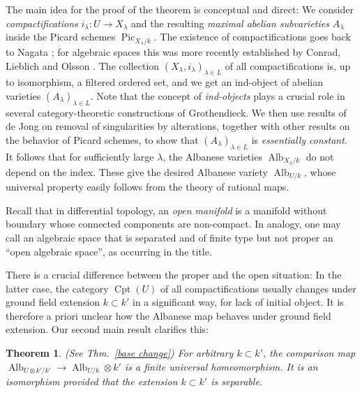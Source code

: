 \documentclass[oneside, 12pt]{amsart}
\newtheorem*{maintheorem}{Theorem}
\theoremstyle{definition}
\theoremstyle{remark}
\newcommand{\Alb}{\operatorname{Alb}}
\renewcommand{\O}{\mathscr{O}}
\newcommand{\Pic}{\operatorname{Pic}}
\newcommand{\ra}{\rightarrow}
\newcommand{\Cpt}{\operatorname{Cpt}}
\begin{document}
The  main idea  for the proof of the theorem 
is    conceptual and direct: We consider   \emph{compactifications} $i_\lambda:U\ra X_\lambda$ and the resulting \emph{maximal abelian subvarieties} $A_\lambda$
inside the  Picard schemes $\Pic_{X_\lambda/k}$. The existence of compactifications
goes back to Nagata \cite{Nagata 1962}; for algebraic spaces this was more recently established by  
Conrad, Lieblich and Olsson \cite{Conrad; Lieblich; Olsson 2012}. 
The collection  $(X_\lambda,i_\lambda)_{\lambda\in L}$ of all compactifications  is, up to isomorphism, a filtered ordered set, and  
we get an  ind-object of abelian varieties  $(A_\lambda)_{\lambda\in L}$. Note that the concept of \emph{ind-objects} plays a crucial 
role in several category-theoretic constructions of Grothendieck.
We then use results of de Jong \cite{de Jong 1997} on removal of singularities by alterations,
together with other results on the behavior of Picard schemes, 
to show that    $(A_\lambda)_{\lambda\in L}$ is \emph{essentially constant}. It follows that for sufficiently large $\lambda$,
the Albanese varieties $\Alb_{X_\lambda/k}$ do  not depend on the index.
These    give  the desired Albanese variety $\Alb_{U/k}$, whose universal property easily follows from the   theory of  rational maps. 

Recall that in differential topology, an  \emph{open manifold} is a manifold without boundary whose connected components are non-compact.
In analogy, one may call an algebraic space   that is separated and of finite type but not  proper
an ``open  algebraic space'', as occurring in the title.

There is  a crucial difference between the proper and the open situation:
In the latter case, the category $\Cpt(U)$ of all compactifications usually changes under
ground field extension $k\subset k'$ in a significant way, for lack of initial object.
It is therefore   a priori unclear how the Albanese map behaves under ground field
extension.  Our second main result clarifies this:

\begin{maintheorem}
(See Thm.\ \ref{base change})
For arbitrary $k\subset k'$, the comparison map $\Alb_{U\otimes k'/k'}\ra \Alb_{U/k}\otimes k'$ is a finite universal homeomorphism.
It is an isomorphism provided that the extension $k\subset k'$ is separable.
\end{maintheorem}
\end{document}
